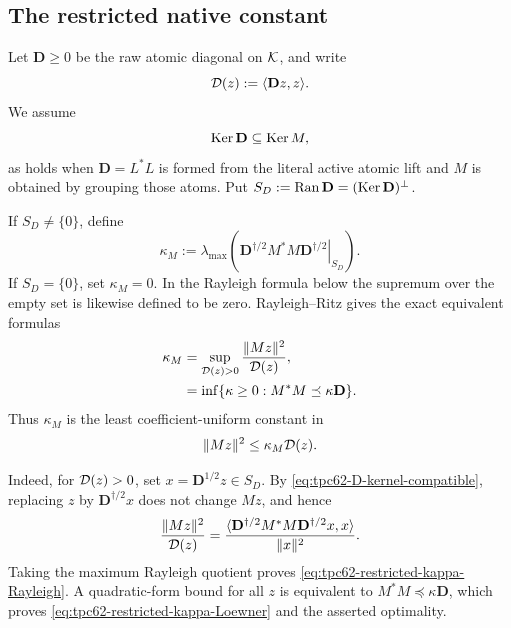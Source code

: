 \subsection{The restricted native constant}

Let \(\mathbf D\ge0\) be the raw atomic diagonal on \(\mathcal K\), and write
\begin{equation}
 \mathcal D(z):=\langle\mathbf Dz,z\rangle.
 \label{eq:tpc62-raw-atomic-form}
\end{equation}
We assume
\begin{equation}
 \operatorname{Ker}\mathbf D\subseteq\operatorname{Ker} M,
 \label{eq:tpc62-D-kernel-compatible}
\end{equation}
as holds when \(\mathbf D=L^*L\) is formed from the literal active atomic
lift and \(M\) is obtained by grouping those atoms.  Put
\(S_D:=\operatorname{Ran}\mathbf D=(\operatorname{Ker}\mathbf D)^\perp\).

If \(S_D\ne\{0\}\), define
\begin{equation}
 \boxed{
 \kappa_M
 :=\lambda_{\max}\!\left(
   \left.
   \mathbf D^{\dagger/2}M^*M\mathbf D^{\dagger/2}
   \right|_{S_D}
  \right).}
 \label{eq:tpc62-restricted-kappa-definition}
\end{equation}
If \(S_D=\{0\}\), set \(\kappa_M=0\).  In the Rayleigh formula below the
supremum over the empty set is likewise defined to be zero.
Rayleigh--Ritz gives the exact equivalent formulas
\begin{align}
 \kappa_M
 &=\sup_{\mathcal D(z)>0}\frac{\|Mz\|^2}{\mathcal D(z)},
 \label{eq:tpc62-restricted-kappa-Rayleigh}\\
 &=\inf\{\kappa\ge0:M^*M\preceq\kappa\mathbf D\}.
 \label{eq:tpc62-restricted-kappa-Loewner}
\end{align}
Thus \(\kappa_M\) is the least coefficient-uniform constant in
\begin{equation}
 \|Mz\|^2\le\kappa_M\mathcal D(z).
 \label{eq:tpc62-restricted-kappa-bound}
\end{equation}

Indeed, for \(\mathcal D(z)>0\), set \(x=\mathbf D^{1/2}z\in S_D\).  By
\eqref{eq:tpc62-D-kernel-compatible}, replacing \(z\) by
\(\mathbf D^{\dagger/2}x\) does not change \(Mz\), and hence
\[
 \frac{\|Mz\|^2}{\mathcal D(z)}
 =\frac{\langle
  \mathbf D^{\dagger/2}M^*M\mathbf D^{\dagger/2}x,x
  \rangle}{\|x\|^2}.
\]
Taking the maximum Rayleigh quotient proves
\eqref{eq:tpc62-restricted-kappa-Rayleigh}.  A quadratic-form bound for
all \(z\) is equivalent to
\(M^*M\preceq\kappa\mathbf D\), which proves
\eqref{eq:tpc62-restricted-kappa-Loewner} and the asserted optimality.

